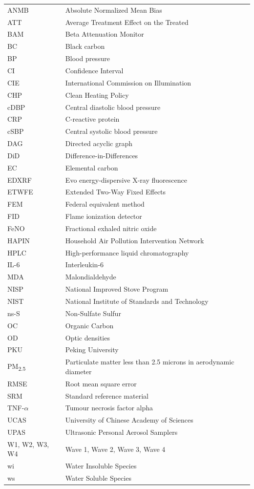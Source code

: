\documentclass[
  letterpaper,
  DIV=11,
  numbers=noendperiod]{scrartcl}
\begin{document}
\begin{longtable}[]{@{}
  >{\raggedright\arraybackslash}p{}
  >{\raggedright\arraybackslash}p{}@{}}
\toprule\noalign{}
\endhead
\bottomrule\noalign{}
\endlastfoot
ANMB & Absolute Normalized Mean Bias \\
ATT & Average Treatment Effect on the Treated \\
BAM & Beta Attenuation Monitor \\
BC & Black carbon \\
BP & Blood pressure \\
CI & Confidence Interval \\
CIE & International Commission on Illumination \\
CHP & Clean Heating Policy \\
cDBP & Central diastolic blood pressure \\
CRP & C-reactive protein \\
cSBP & Central systolic blood pressure \\
DAG & Directed acyclic graph \\
DiD & Difference-in-Differences \\
EC & Elemental carbon \\
EDXRF & Evo energy-dispersive X-ray fluorescence \\
ETWFE & Extended Two-Way Fixed Effects \\
FEM & Federal equivalent method \\
FID & Flame ionization detector \\
FeNO & Fractional exhaled nitric oxide \\
HAPIN & Household Air Pollution Intervention Network \\
HPLC & High-performance liquid chromatography \\
IL-6 & Interleukin-6 \\
MDA & Malondialdehyde \\
NISP & National Improved Stove Program \\
NIST & National Institute of Standards and Technology \\
ns-S & Non-Sulfate Sulfur \\
OC & Organic Carbon \\
OD & Optic densities \\
PKU & Peking University \\
PM\textsubscript{2.5} & Particulate matter less than 2.5 microns in
aerodynamic diameter \\
RMSE & Root mean square error \\
SRM & Standard reference material \\
TNF-\(\alpha\) & Tumour necrosis factor alpha \\
UCAS & University of Chinese Academy of Sciences \\
UPAS & Ultrasonic Personal Aerosol Samplers \\
W1, W2, W3, W4 & Wave 1, Wave 2, Wave 3, Wave 4 \\
wi & Water Insoluble Species \\
ws & Water Soluble Species \\
\end{longtable}
\end{document}
